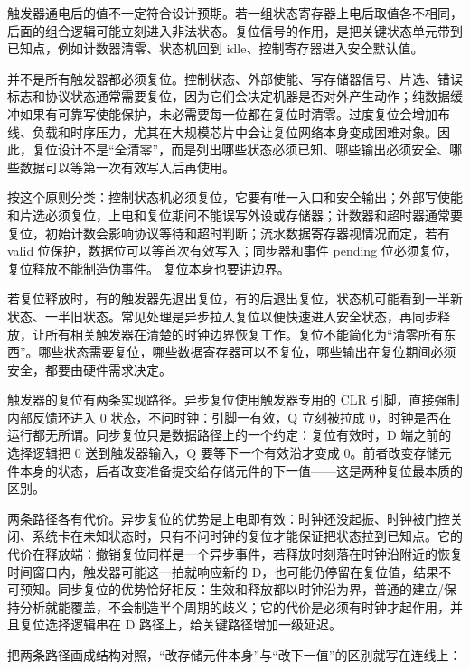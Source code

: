 触发器通电后的值不一定符合设计预期。若一组状态寄存器上电后取值各不相同，后面的组合逻辑可能立刻进入非法状态。复位信号的作用，是把关键状态单元带到已知点，例如计数器清零、状态机回到 idle、控制寄存器进入安全默认值。

并不是所有触发器都必须复位。控制状态、外部使能、写存储器信号、片选、错误标志和协议状态通常需要复位，因为它们会决定机器是否对外产生动作；纯数据缓冲如果有可靠写使能保护，未必需要每一位都在复位时清零。过度复位会增加布线、负载和时序压力，尤其在大规模芯片中会让复位网络本身变成困难对象。因此，复位设计不是“全清零”，而是列出哪些状态必须已知、哪些输出必须安全、哪些数据可以等第一次有效写入后再使用。

按这个原则分类：控制状态机必须复位，它要有唯一入口和安全输出；外部写使能和片选必须复位，上电和复位期间不能误写外设或存储器；计数器和超时器通常要复位，初始计数会影响协议等待和超时判断；流水数据寄存器视情况而定，若有 valid 位保护，数据位可以等首次有效写入；同步器和事件 pending 位必须复位，复位释放不能制造伪事件。
\vspace{1.0em plus 0.35em}
复位本身也要讲边界。

若复位释放时，有的触发器先退出复位，有的后退出复位，状态机可能看到一半新状态、一半旧状态。常见处理是异步拉入复位以便快速进入安全状态，再同步释放，让所有相关触发器在清楚的时钟边界恢复工作。复位不能简化为“清零所有东西”。哪些状态需要复位，哪些数据寄存器可以不复位，哪些输出在复位期间必须安全，都要由硬件需求决定。


触发器的复位有两条实现路径。异步复位使用触发器专用的 CLR 引脚，直接强制内部反馈环进入 0 状态，不问时钟：引脚一有效，Q 立刻被拉成 0，时钟是否在运行都无所谓。同步复位只是数据路径上的一个约定：复位有效时，D 端之前的选择逻辑把 0 送到触发器输入，Q 要等下一个有效沿才变成 0。前者改变存储元件本身的状态，后者改变准备提交给存储元件的下一值——这是两种复位最本质的区别。

两条路径各有代价。异步复位的优势是上电即有效：时钟还没起振、时钟被门控关闭、系统卡在未知状态时，只有不问时钟的复位才能保证把状态拉到已知点。它的代价在释放端：撤销复位同样是一个异步事件，若释放时刻落在时钟沿附近的恢复时间窗口内，触发器可能这一拍就响应新的 D，也可能仍停留在复位值，结果不可预知。同步复位的优势恰好相反：生效和释放都以时钟沿为界，普通的建立/保持分析就能覆盖，不会制造半个周期的歧义；它的代价是必须有时钟才起作用，并且复位选择逻辑串在 D 路径上，给关键路径增加一级延迟。

把两条路径画成结构对照，“改存储元件本身”与“改下一值”的区别就写在连线上：


